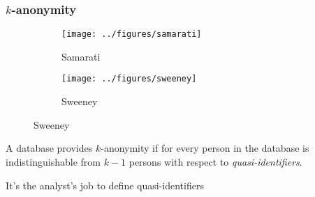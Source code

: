 \begin{frame}
  \frametitle{$k$-anonymity}
  \begin{figure}[H]
    \centering
    \begin{subfigure}{0.45\textwidth}
      \texttt{[image: ../figures/samarati]}
      \caption{Samarati}
    \end{subfigure}
    \begin{subfigure}{0.45\textwidth}
      \texttt{[image: ../figures/sweeney]}
      \caption{Sweeney}
    \end{subfigure}
  \end{figure}

  \begin{definition}[$k$-anonymity]
    A database provides $k$-anonymity if for every person in the database is indistinguishable from $k-1$ persons with respect to \emph{quasi-identifiers}.
  \end{definition}
  \alert{It's the analyst's job to define quasi-identifiers}
  
\end{frame}

